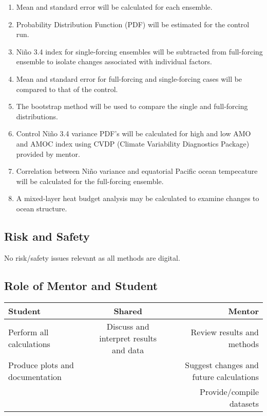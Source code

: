 \documentclass{article}
\begin{document}
\begin{enumerate}

	\item Mean and standard error will be calculated for each ensemble.
	\item Probability Distribution Function (PDF) will be estimated for the control run.
	\item Ni\~{n}o 3.4 index for single-forcing ensembles will be subtracted from full-forcing ensemble to isolate changes associated with individual factors.
	\item Mean and standard error for full-forcing and single-forcing cases will be compared to that of the control.
	\item The bootstrap method will be used to compare the single and full-forcing distributions.
	\item Control Ni\~{n}o 3.4 variance PDF's will be calculated for high and low AMO and AMOC index using CVDP (Climate Variability Diagnostics Package) provided by mentor.
	\item Correlation between Ni\~{n}o variance and equatorial Pacific ocean tempecature will be calculated for the full-forcing ensemble.
	\item A mixed-layer heat budget analysis may be calculated to examine changes to ocean structure.
	
\end{enumerate}

\subsection{Risk and Safety}

No risk/safety issues relevant as all methods are digital.


\subsection{Role of Mentor and Student}

\begin{adjustbox}{width=1.5\textwidth, center=\textwidth}
\begin{tabular}{| l | c | r |}

\hline
Student & Shared & Mentor\\
\hline

Perform all calculations & Discuss and interpret results and data & Review results and methods\\
Produce plots and documentation &       & Suggest changes and future calculations\\
 & & Provide/compile datasets\\

\hline

\end{tabular}
\end{adjustbox}



\end{document}
